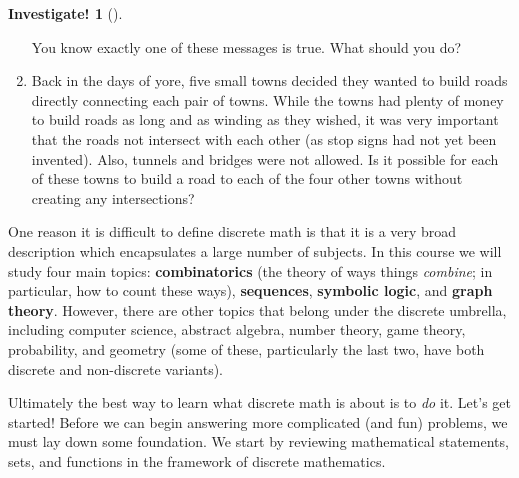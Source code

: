 \documentclass[10pt,]{book}
\newcommand{\terminology}[1]{\textbf{#1}}
\theoremstyle{plain}
\theoremstyle{definition}
\theoremstyle{definition}
\newtheorem{investigation}[project]{Investigate!}
\numberwithin{equation}{chapter}
\begin{document}
\begin{investigation}[]
\begin{enumerate}
\par
\hypertarget{p-31}{}%
You know exactly one of these messages is true. What should you do?%
\item\hypertarget{li-8}{}\hypertarget{p-32}{}%
Back in the days of yore, five small towns decided they wanted to build roads directly connecting each pair of towns. While the towns had plenty of money to build roads as long and as winding as they wished, it was very important that the roads not intersect with each other (as stop signs had not yet been invented). Also, tunnels and bridges were not allowed. Is it possible for each of these towns to build a road to each of the four other towns without creating any intersections?%
\end{enumerate}
%
\end{investigation}
\hypertarget{p-33}{}%
One reason it is difficult to define discrete math is that it is a very broad description which encapsulates a large number of subjects. In this course we will study four main topics: \terminology{combinatorics} (the theory of ways things \emph{combine}; in particular, how to count these ways), \terminology{sequences}, \terminology{symbolic logic}, and \terminology{graph theory}. However, there are other topics that belong under the discrete umbrella, including computer science, abstract algebra, number theory, game theory, probability, and geometry (some of these, particularly the last two, have both discrete and non-discrete variants).%
\par
\hypertarget{p-34}{}%
Ultimately the best way to learn what discrete math is about is to \emph{do} it. Let's get started! Before we can begin answering more complicated (and fun) problems, we must lay down some foundation. We start by reviewing mathematical statements, sets, and functions in the framework of discrete mathematics.%
\typeout{************************************************}
\typeout{************************************************}
\end{document}
